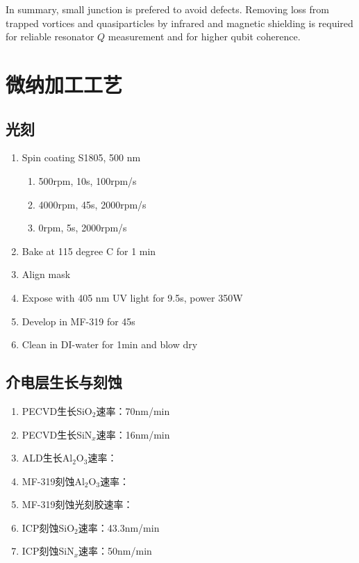 In summary, small junction is prefered to avoid defects. Removing loss from trapped vortices and quasiparticles by infrared and magnetic shielding is required for reliable resonator $Q$ measurement and for higher qubit coherence.











\chapter{微纳加工工艺} %
\label{cha:fabrication}

\section{光刻} %
\label{sec:光刻}
    \begin{enumerate}
        \item Spin coating S1805, 500 nm
        \begin{enumerate}
            \item 500rpm, 10s, 100rpm/s
            \item 4000rpm, 45s, 2000rpm/s
            \item 0rpm, 5s, 2000rpm/s
        \end{enumerate}
        \item Bake at 115 degree C for 1 min
        \item Align mask
        \item Expose with 405 nm UV light for 9.5s, power 350W
        \item Develop in MF-319 for 45s
        \item Clean in DI-water for 1min and blow dry
    \end{enumerate}

\section{介电层生长与刻蚀} %
\label{sec:介电层生长与刻蚀}
    \begin{enumerate}
        \item PECVD生长SiO$_2$速率：70nm/min
        \item PECVD生长SiN$_x$速率：16nm/min
        \item ALD生长Al$_2$O$_3$速率：
        \item MF-319刻蚀Al$_2$O$_3$速率：
        \item MF-319刻蚀光刻胶速率：
        \item ICP刻蚀SiO$_2$速率：43.3nm/min
        \item ICP刻蚀SiN$_x$速率：50nm/min
    \end{enumerate}
